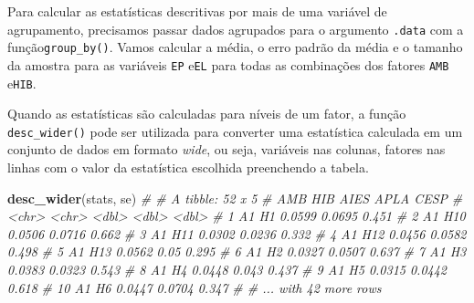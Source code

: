 \documentclass[
]{book}
\newenvironment{Shaded}{\begin{snugshade}}{\end{snugshade}}
\newcommand{\CommentTok}[1]{\textcolor[rgb]{0.56,0.35,0.01}{\textit{#1}}}
\newcommand{\DataTypeTok}[1]{\textcolor[rgb]{0.13,0.29,0.53}{#1}}
\newcommand{\KeywordTok}[1]{\textcolor[rgb]{0.13,0.29,0.53}{\textbf{#1}}}
\newcommand{\NormalTok}[1]{#1}
\newcommand{\OperatorTok}[1]{\textcolor[rgb]{0.81,0.36,0.00}{\textbf{#1}}}
\newcommand{\StringTok}[1]{\textcolor[rgb]{0.31,0.60,0.02}{#1}}
\begin{document}

Para calcular as estatísticas descritivas por mais de uma variável de agrupamento, precisamos passar dados agrupados para o argumento \texttt{.data} com a função\texttt{group\_by()}. Vamos calcular a média, o erro padrão da média e o tamanho da amostra para as variáveis \texttt{EP} e\texttt{EL} para todas as combinações dos fatores \texttt{AMB} e\texttt{HIB}.

\begin{Shaded}
\end{Shaded}

Quando as estatísticas são calculadas para níveis de um fator, a função \texttt{desc\_wider()} pode ser utilizada para converter uma estatística calculada em um conjunto de dados em formato \emph{wide}, ou seja, variáveis nas colunas, fatores nas linhas com o valor da estatística escolhida preenchendo a tabela.

\begin{Shaded}
\begin{Highlighting}[]
\KeywordTok{desc_wider}\NormalTok{(stats, se)}
\CommentTok{# # A tibble: 52 x 5}
\CommentTok{#    AMB   HIB     AIES   APLA  CESP}
\CommentTok{#    <chr> <chr>  <dbl>  <dbl> <dbl>}
\CommentTok{#  1 A1    H1    0.0599 0.0695 0.451}
\CommentTok{#  2 A1    H10   0.0506 0.0716 0.662}
\CommentTok{#  3 A1    H11   0.0302 0.0236 0.332}
\CommentTok{#  4 A1    H12   0.0456 0.0582 0.498}
\CommentTok{#  5 A1    H13   0.0562 0.05   0.295}
\CommentTok{#  6 A1    H2    0.0327 0.0507 0.637}
\CommentTok{#  7 A1    H3    0.0383 0.0323 0.543}
\CommentTok{#  8 A1    H4    0.0448 0.043  0.437}
\CommentTok{#  9 A1    H5    0.0315 0.0442 0.618}
\CommentTok{# 10 A1    H6    0.0447 0.0704 0.347}
\CommentTok{# # ... with 42 more rows}
\end{Highlighting}
\end{Shaded}
\end{document}
